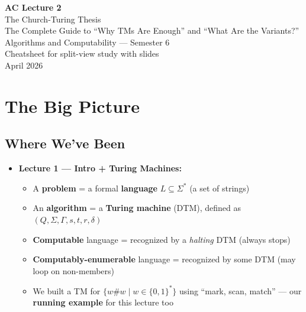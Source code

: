 \documentclass[11pt,a4paper]{article}
\begin{document}
\begin{center}
{\Huge\bfseries AC Lecture 2}\\[0.5em]
{\LARGE The Church-Turing Thesis}\\[0.3em]
{\large The Complete Guide to ``Why TMs Are Enough'' and ``What Are the Variants?''}\\[1em]
{\normalsize Algorithms and Computability --- Semester 6}\\
{\normalsize Cheatsheet for split-view study with slides}\\[0.5em]
{\normalsize April 2026}
\end{center}

\vspace{1em}
\tableofcontents
\newpage

\section{The Big Picture}

\subsection{Where We've Been}

\begin{itemize}[nosep]
\item \textbf{Lecture 1 --- Intro + Turing Machines:}
  \begin{itemize}[nosep]
  \item A \textbf{problem} = a formal \textbf{language} $L \subseteq \Sigma^*$ (a set of strings)
  \item An \textbf{algorithm} = a \textbf{Turing machine} (DTM), defined as $(Q, \Sigma, \Gamma, s, t, r, \delta)$
  \item \textbf{Computable} language = recognized by a \textit{halting} DTM (always stops)
  \item \textbf{Computably-enumerable} language = recognized by some DTM (may loop on non-members)
  \item We built a TM for $\{w\#w \mid w \in \{0,1\}^*\}$ using ``mark, scan, match'' --- our \textbf{running example} for this lecture too
  \end{itemize}
\end{itemize}
\end{document}
